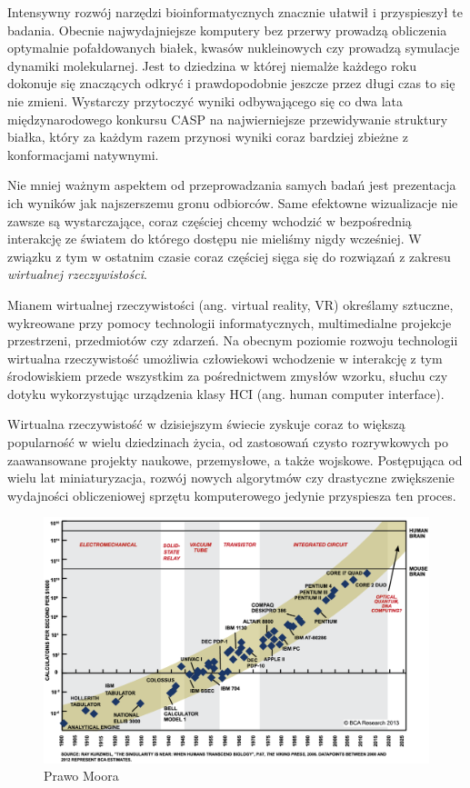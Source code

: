 \documentclass[licencjacka]{pracamgr}
\begin{document}
Intensywny rozwój narzędzi bioinformatycznych znacznie ułatwił i przyspieszył te badania. Obecnie najwydajniejsze komputery bez przerwy prowadzą obliczenia optymalnie pofałdowanych białek, kwasów nukleinowych czy prowadzą symulacje dynamiki molekularnej. Jest to dziedzina w której niemalże każdego roku dokonuje się znaczących odkryć i prawdopodobnie jeszcze przez długi czas to się nie zmieni. Wystarczy przytoczyć wyniki odbywającego się co dwa lata międzynarodowego konkursu CASP na najwierniejsze przewidywanie struktury białka, który za każdym razem przynosi wyniki coraz bardziej zbieżne z konformacjami natywnymi.

Nie mniej ważnym aspektem od przeprowadzania samych badań jest prezentacja ich wyników jak najszerszemu gronu odbiorców. Same efektowne wizualizacje nie zawsze są wystarczające, coraz częściej chcemy wchodzić w bezpośrednią interakcję ze światem do którego dostępu nie mieliśmy nigdy wcześniej. W związku z tym w ostatnim czasie coraz częściej sięga się do rozwiązań z zakresu \textit{wirtualnej rzeczywistości}. 

Mianem wirtualnej rzeczywistości (ang. virtual reality, VR) określamy sztuczne, wykreowane przy pomocy technologii informatycznych, multimedialne projekcje przestrzeni, przedmiotów czy zdarzeń. Na obecnym poziomie rozwoju technologii wirtualna rzeczywistość umożliwia człowiekowi wchodzenie w interakcję z tym środowiskiem przede wszystkim za pośrednictwem zmysłów wzorku, słuchu czy dotyku wykorzystując urządzenia klasy HCI (ang. human computer interface). 

Wirtualna rzeczywistość w dzisiejszym świecie zyskuje coraz to większą popularność w wielu dziedzinach życia, od zastosowań czysto rozrywkowych po zaawansowane projekty naukowe, przemysłowe, a także wojskowe. Postępująca od wielu lat miniaturyzacja, rozwój nowych algorytmów czy drastyczne zwiększenie wydajności obliczeniowej sprzętu komputerowego jedynie przyspiesza ten proces.

\begin{figure}[H]
\centering
\includegraphics[scale=0.35,center]{MooresLaw}
\caption{Prawo Moora}
\end{figure}
\end{document}

